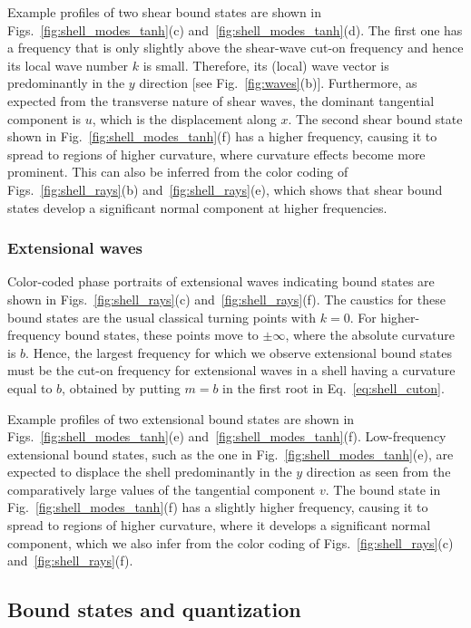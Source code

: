 Example profiles of two shear bound states are shown in Figs.~\ref{fig:shell_modes_tanh}(c) and~\ref{fig:shell_modes_tanh}(d).
The first one has a frequency that is only slightly above the shear-wave cut-on frequency and hence its local wave number $k$ is small.
Therefore, its (local) wave vector is predominantly in the $y$ direction [see Fig.~\ref{fig:waves}(b)].
Furthermore, as expected from the transverse nature of shear waves, the dominant tangential component is $u$, which is the displacement along $x$.
The second shear bound state shown in Fig.~\ref{fig:shell_modes_tanh}(f) has a higher frequency, causing it to spread to regions of higher curvature, where curvature effects become more prominent.
This can also be inferred from the color coding of Figs.~\ref{fig:shell_rays}(b) and~\ref{fig:shell_rays}(e), which shows that shear bound states develop a significant normal component at higher frequencies.

\subsubsection{Extensional waves}

Color-coded phase portraits of extensional waves indicating bound states are shown in Figs.~\ref{fig:shell_rays}(c) and~\ref{fig:shell_rays}(f).
The caustics for these bound states are the usual classical turning points with $k=0$.
For higher-frequency bound states, these points move to $\pm \infty$, where the absolute curvature is $b$.
Hence, the largest frequency for which we observe extensional bound states must be the cut-on frequency for extensional waves in a shell having a curvature equal to $b$, obtained by putting $m = b$ in the first root in Eq.~\eqref{eq:shell_cuton}.

Example profiles of two extensional bound states are shown in Figs.~\ref{fig:shell_modes_tanh}(e) and~\ref{fig:shell_modes_tanh}(f).
Low-frequency extensional bound states, such as the one in Fig.~\ref{fig:shell_modes_tanh}(e), are expected to displace the shell predominantly in the $y$ direction as seen from the comparatively large values of the tangential component $v$.
The bound state in Fig.~\ref{fig:shell_modes_tanh}(f) has a slightly higher frequency, causing it to spread to regions of higher curvature, where it develops a significant normal component, which we also infer from the color coding of Figs.~\ref{fig:shell_rays}(c) and~\ref{fig:shell_rays}(f).

\subsection{Bound states and quantization}

